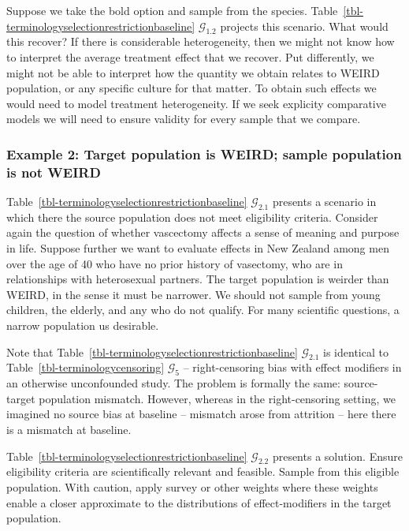 \documentclass[
  single column]{article}
\begin{document}
Suppose we take the bold option and sample from the species.
Table~\ref{tbl-terminologyselectionrestrictionbaseline}
\(\mathcal{G}_{1.2}\) projects this scenario. What would this recover?
If there is considerable heterogeneity, then we might not know how to
interpret the average treatment effect that we recover. Put differently,
we might not be able to interpret how the quantity we obtain relates to
WEIRD population, or any specific culture for that matter. To obtain
such effects we would need to model treatment heterogeneity. If we seek
explicity comparative models we will need to ensure validity for every
sample that we compare.

\subsubsection{Example 2: Target population is WEIRD; sample population
is not
WEIRD}\label{example-2-target-population-is-weird-sample-population-is-not-weird}

Table~\ref{tbl-terminologyselectionrestrictionbaseline}
\(\mathcal{G}_{2.1}\) presents a scenario in which there the source
population does not meet eligibility criteria. Consider again the
question of whether vascectomy affects a sense of meaning and purpose in
life. Suppose further we want to evaluate effects in New Zealand among
men over the age of 40 who have no prior history of vasectomy, who are
in relationships with heterosexual partners. The target population is
weirder than WEIRD, in the sense it must be narrower. We should not
sample from young children, the elderly, and any who do not qualify. For
many scientific questions, a narrow population us desirable.

Note that Table~\ref{tbl-terminologyselectionrestrictionbaseline}
\(\mathcal{G}_{2.1}\) is identical to
Table~\ref{tbl-terminologycensoring} \(\mathcal{G}_5\) --
right-censoring bias with effect modifiers in an otherwise unconfounded
study. The problem is formally the same: source-target population
mismatch. However, whereas in the right-censoring setting, we imagined
no source bias at baseline -- mismatch arose from attrition -- here
there is a mismatch at baseline.

Table~\ref{tbl-terminologyselectionrestrictionbaseline}
\(\mathcal{G}_{2.2}\) presents a solution. Ensure eligibility criteria
are scientifically relevant and feasible. Sample from this eligible
population. With caution, apply survey or other weights where these
weights enable a closer approximate to the distributions of
effect-modifiers in the target population.
\end{document}
